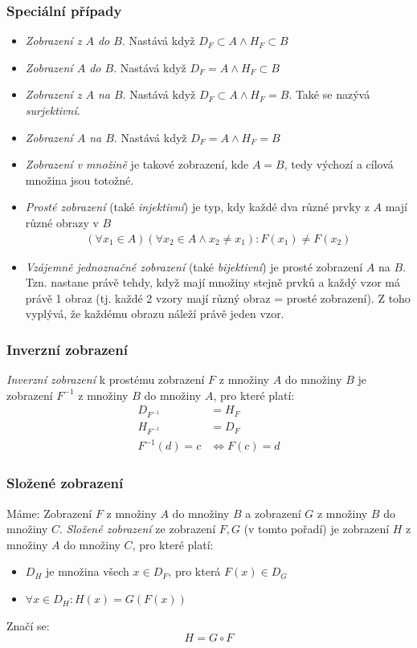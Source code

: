 \documentclass[12pt]{article}
\begin{document}
\subsubsection{Speciální případy}
\begin{itemize}
\item \emph{Zobrazení z $A$ do $B$}. Nastává když $D_F \subset A \land H_F \subset B$
\item \emph{Zobrazení $A$ do $B$}. Nastává když $D_F = A \land H_F \subset B$
\item \emph{Zobrazení z $A$ na $B$}. Nastává když $D_F \subset A \land H_F = B$. Také se nazývá \emph{surjektivní}.
\item \emph{Zobrazení $A$ na $B$}. Nastává když $D_F = A \land H_F = B$
\item \emph{Zobrazení v množině} je takové zobrazení, kde $A =B$, tedy výchozí a cílová množina jsou totožné.
\item \emph{Prosté zobrazení} (také \emph{injektivní}) je typ, kdy každé dva různé prvky z $A$ mají různé obrazy v $B$
\begin{align}
(\forall x_1 \in A)(\forall x_2 \in A \land x_2 \neq x_1): F(x_1) \neq F(x_2)
\end{align}
\item \emph{Vzájemně jednoznačné zobrazení} (také \emph{bijektivní}) je prosté zobrazení $A$ na $B$. Tzn. nastane právě tehdy, když mají množiny stejně prvků a každý vzor má právě 1 obraz (tj. každé 2 vzory mají různý obraz = prosté zobrazení). Z toho vyplývá, že každému obrazu náleží právě jeden vzor.
\end{itemize}
\subsubsection{Inverzní zobrazení}
\emph{Inverzní zobrazení} k prostému zobrazení $F$ z množiny $A$ do množiny $B$ je zobrazení $F^{-1}$ z množiny $B$ do množiny $A$, pro které platí:
\begin{align}
D_{F^{-1}} &= H_F\\
H_{F^{-1}} &= D_F\\
F^{-1}(d) = c &\iff F(c) =d
\end{align}
\subsubsection{Složené zobrazení}
Máme: Zobrazení $F$ z množiny $A$ do množiny $B$ a zobrazení $G$ z množiny $B$ do množiny $C$. \emph{Složené zobrazení} ze zobrazení $F, G$ (v tomto pořadí) je zobrazení $H$ z množiny $A$ do množiny $C$, pro které platí:
\begin{itemize}
\item $D_H$ je množina všech  $x \in D_F$, pro která $F(x) \in D_G$
\item $\forall x \in D_H: H(x) = G(F(x)) $
\end{itemize}
Značí se:
\begin{equation}
H = G \circ F
\end{equation}
\end{document}
